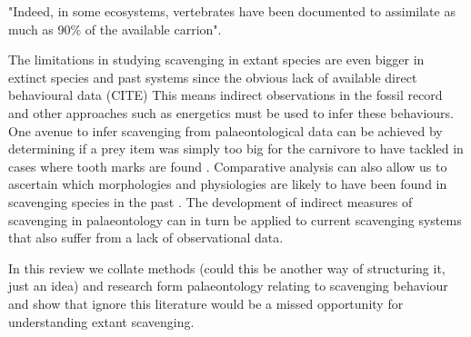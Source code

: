 \documentclass[a4paper,12pt]{article}
\begin{document}
"Indeed, in some ecosystems, vertebrates have been documented to assimilate as much as 90\% of the available carrion"\citep{benbow2015introduction}.


The limitations in studying scavenging in extant species are even bigger in extinct species and past systems since the obvious lack of available direct behavioural data (CITE) %
This means indirect observations in the fossil record and other approaches such as energetics must be used to infer these behaviours. %
One avenue to infer scavenging from palaeontological data can be achieved by determining if a prey item was simply too big for the carnivore to have tackled in cases where tooth marks are found \citep{pobiner2008paleoecological}. 
Comparative analysis can also allow us to ascertain which morphologies and physiologies are likely to have been found in scavenging species in the past \citep{ruxton2004obligate}.
The development of indirect measures of scavenging in palaeontology can in turn be applied to current scavenging systems that also suffer from a lack of observational data.

In this review we collate methods (could this be another way of structuring it, just an idea) and research form palaeontology relating to scavenging behaviour and show that ignore this literature would be a missed opportunity for understanding extant scavenging.
\end{document}

